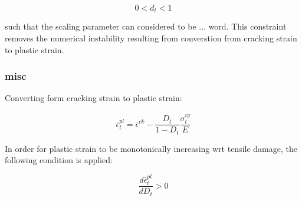 \begin{equation}
0<d_{t}<1\label{eqn:param10}
\end{equation}


such that the scaling parameter can considered to be ... word. This
constraint removes the numerical instability resulting from converstion
from cracking strain to plastic strain. 


\subsubsection{misc}

Converting form cracking strain to plastic strain:

\begin{equation}
\bar{\epsilon}_{t}^{pl}=\bar{\epsilon}^{ck}-\frac{D_{t}}{1-D_{t}}\frac{\sigma_{t}^{iy}}{E}\label{eqn:param5}
\end{equation}


In order for plastic strain to be monotonically increasing wrt tensile
damage, the following condition is applied:

\begin{equation}
\frac{d\bar{\epsilon}_{t}^{pl}}{dD_{t}}>0\label{eqn:param6}
\end{equation}
